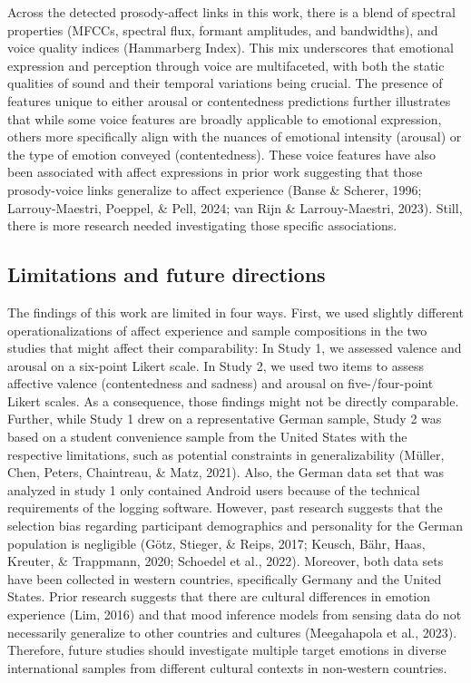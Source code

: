 \documentclass[
  english,
  man,floatsintext]{apa6}
\begin{document}
Across the detected prosody-affect links in this work, there is a blend of spectral properties (MFCCs, spectral flux, formant amplitudes, and bandwidths), and voice quality indices (Hammarberg Index). This mix underscores that emotional expression and perception through voice are multifaceted, with both the static qualities of sound and their temporal variations being crucial. The presence of features unique to either arousal or contentedness predictions further illustrates that while some voice features are broadly applicable to emotional expression, others more specifically align with the nuances of emotional intensity (arousal) or the type of emotion conveyed (contentedness). These voice features have also been associated with affect expressions in prior work suggesting that those prosody-voice links generalize to affect experience (Banse \& Scherer, 1996; Larrouy-Maestri, Poeppel, \& Pell, 2024; van Rijn \& Larrouy-Maestri, 2023). Still, there is more research needed investigating those specific associations.

\hypertarget{limitations-and-future-directions}{%
\subsection{Limitations and future directions}\label{limitations-and-future-directions}}

The findings of this work are limited in four ways. First, we used slightly different operationalizations of affect experience and sample compositions in the two studies that might affect their comparability: In Study 1, we assessed valence and arousal on a six-point Likert scale. In Study 2, we used two items to assess affective valence (contentedness and sadness) and arousal on five-/four-point Likert scales. As a consequence, those findings might not be directly comparable. Further, while Study 1 drew on a representative German sample, Study 2 was based on a student convenience sample from the United States with the respective limitations, such as potential constraints in generalizability (Müller, Chen, Peters, Chaintreau, \& Matz, 2021). Also, the German data set that was analyzed in study 1 only contained Android users because of the technical requirements of the logging software. However, past research suggests that the selection bias regarding participant demographics and personality for the German population is negligible (Götz, Stieger, \& Reips, 2017; Keusch, Bähr, Haas, Kreuter, \& Trappmann, 2020; Schoedel et al., 2022). Moreover, both data sets have been collected in western countries, specifically Germany and the United States. Prior research suggests that there are cultural differences in emotion experience (Lim, 2016) and that mood inference models from sensing data do not necessarily generalize to other countries and cultures (Meegahapola et al., 2023). Therefore, future studies should investigate multiple target emotions in diverse international samples from different cultural contexts in non-western countries.
\end{document}
